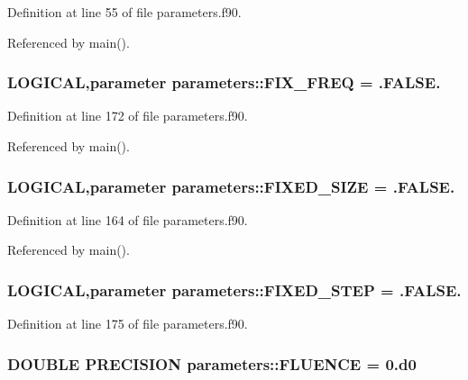 Definition at line 55 of file parameters.f90.

Referenced by main().\hypertarget{namespaceparameters_a557f350ba21ed1a34656e6cce03635fb}{
\subsubsection[{FIX\_\-FREQ}]{\setlength{\rightskip}{0pt plus 5cm}LOGICAL,parameter {\bf parameters::FIX\_\-FREQ} = .FALSE.}}
\label{namespaceparameters_a557f350ba21ed1a34656e6cce03635fb}


Definition at line 172 of file parameters.f90.

Referenced by main().\hypertarget{namespaceparameters_ac3097bdb7852a956a41ef762305769f4}{
\subsubsection[{FIXED\_\-SIZE}]{\setlength{\rightskip}{0pt plus 5cm}LOGICAL,parameter {\bf parameters::FIXED\_\-SIZE} = .FALSE.}}
\label{namespaceparameters_ac3097bdb7852a956a41ef762305769f4}


Definition at line 164 of file parameters.f90.

Referenced by main().\hypertarget{namespaceparameters_a1a34e9253cb6baa25fe90345e4a0ceb2}{
\subsubsection[{FIXED\_\-STEP}]{\setlength{\rightskip}{0pt plus 5cm}LOGICAL,parameter {\bf parameters::FIXED\_\-STEP} = .FALSE.}}
\label{namespaceparameters_a1a34e9253cb6baa25fe90345e4a0ceb2}


Definition at line 175 of file parameters.f90.\hypertarget{namespaceparameters_aad8147e5f72a1603322285137f380e90}{
\subsubsection[{FLUENCE}]{\setlength{\rightskip}{0pt plus 5cm}DOUBLE PRECISION {\bf parameters::FLUENCE} = 0.d0}}
\label{namespaceparameters_aad8147e5f72a1603322285137f380e90}


